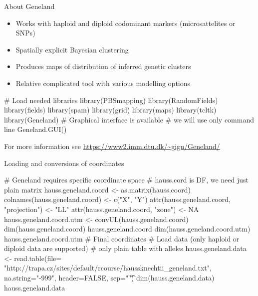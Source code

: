 \documentclass[compress, ucs, xelatex, 11pt, xcolor=svgnames,
  hyperref={
    bookmarks=true,
    unicode=true,
    colorlinks=true,
    pdftitle={Molecular data in R},
    plainpages=false,
    pdfauthor={Vojtech Zeisek},
    pdfsubject={Course about phylogeny and evolution in R},
    pdfcreator={XeLaTeX},
    pdfkeywords={R, evolution, phylogeny, molecular data},
    linkcolor=Tomato,
    anchorcolor=SaddleBrown,
    citecolor=Goldenrod,
    filecolor=DarkMagenta,
    menucolor=Sienna,
    urlcolor=DarkTurquoise,
    pdftex},
  url={hyphens, lowtilde} %
  ]{beamer}
\begin{document}
\begin{frame}[fragile]{About Geneland}
\begin{multicols}{2}
\begin{itemize}
 \item Works with haploid and diploid codominant markers (microsattelites or SNPs)
 \item Spatially explicit Bayesian clustering
 \item Produces maps of distribution of inferred genetic clusters
 \item Relative complicated tool with various modelling options
\end{itemize}
  \columnbreak
  \begin{spluscode}
    # Load needed libraries
    library(PBSmapping)
    library(RandomFields)
    library(fields)
    library(spam)
    library(grid)
    library(maps)
    library(tcltk)
    library(Geneland)
    # Graphical interface is available
    # we will use only command line
    Geneland.GUI()
  \end{spluscode}
\end{multicols}
For more information see \url{https://www2.imm.dtu.dk/~gigu/Geneland/}
\end{frame}

\begin{frame}[fragile]{Loading and conversions of coordinates}
  \begin{spluscode}
    # Geneland requires specific coordinate space
    # hauss.cord is DF, we need just plain matrix
    hauss.geneland.coord <- as.matrix(hauss.coord)
    colnames(hauss.geneland.coord) <- c("X", "Y")
    attr(hauss.geneland.coord, "projection") <- "LL"
    attr(hauss.geneland.coord, "zone") <- NA
    hauss.geneland.coord.utm <- convUL(hauss.geneland.coord)
    dim(hauss.geneland.coord)
    hauss.geneland.coord
    dim(hauss.geneland.coord.utm)
    hauss.geneland.coord.utm # Final coordinates
    # Load data (only haploid or diploid data are supported)
    # only plain table with alleles
    hauss.geneland.data <- read.table(file=
      "http://trapa.cz/sites/default/rcourse/haussknechtii_geneland.txt",
      na.string="-999", header=FALSE, sep="\t")
    dim(hauss.geneland.data)
    hauss.geneland.data
  \end{spluscode}
\end{frame}
\end{document}
